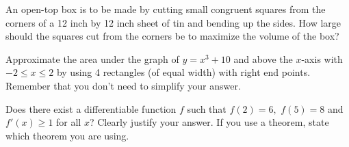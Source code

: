 \documentclass[addpoints,12pt]{exam}
\newcommand{\chooseone}{{\Large$\Circle$\ \ }}
\begin{document}
\begin{questions}













\newpage

\question[10] An open-top box is to be made by cutting small congruent squares from the
corners of a 12 inch by 12 inch sheet of tin and bending up the sides. How large should the
squares cut from the corners be to maximize the volume of the box?

\newpage




\question[10] Approximate the area under the graph of $y = x^3+ 10$ and above the $x$-axis
with $-2 \le x\le 2$ by using 4 rectangles (of equal width) with right end points. Remember that
you don't need to simplify your answer.

\newpage




\question[8] Does there exist a differentiable function $f$ such that $f(2) = 6,$ $f(5) = 8$ and
$f'(x) \ge 1$ for all $x$? Clearly justify your answer. If you use a theorem, state which theorem
you are using.


\newpage








\end{questions}
\end{document}
